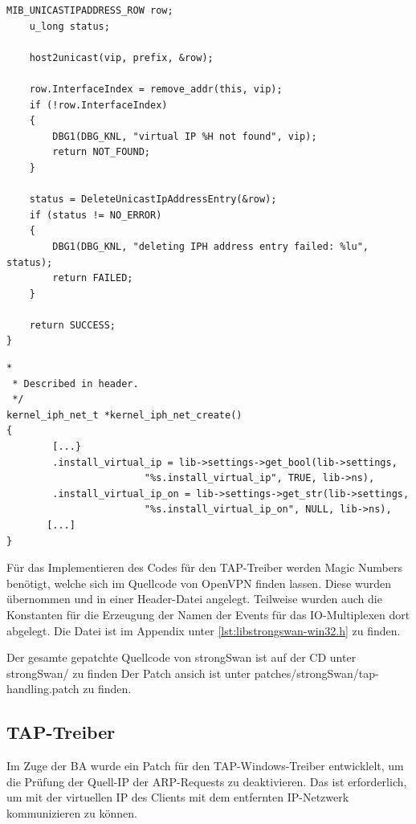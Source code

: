 {\begin{lstlisting}[caption=Code für del\_ip]
	MIB_UNICASTIPADDRESS_ROW row;
	u_long status;

	host2unicast(vip, prefix, &row);

	row.InterfaceIndex = remove_addr(this, vip);
	if (!row.InterfaceIndex)
	{
		DBG1(DBG_KNL, "virtual IP %H not found", vip);
		return NOT_FOUND;
	}

	status = DeleteUnicastIpAddressEntry(&row);
	if (status != NO_ERROR)
	{
		DBG1(DBG_KNL, "deleting IPH address entry failed: %lu", status);
		return FAILED;
	}

	return SUCCESS;
}
\end{lstlisting}

\begin{lstlisting}[caption=Ergänzung zu kernel\_iph\_net\_create()]
*
 * Described in header.
 */
kernel_iph_net_t *kernel_iph_net_create()
{
        [...}
		.install_virtual_ip = lib->settings->get_bool(lib->settings,
						"%s.install_virtual_ip", TRUE, lib->ns),
		.install_virtual_ip_on = lib->settings->get_str(lib->settings,
						"%s.install_virtual_ip_on", NULL, lib->ns),
	   [...]
}
\end{lstlisting}

Für das Implementieren des Codes für den TAP-Treiber werden Magic Numbers benötigt,
welche sich im Quellcode von OpenVPN finden lassen. Diese wurden übernommen
und in einer Header-Datei angelegt.
Teilweise wurden auch die Konstanten für die Erzeugung der Namen der Events für
das IO-Multiplexen dort abgelegt. Die Datei ist im Appendix unter \autoref{lst:libstrongswan-win32.h}
zu finden.

Der gesamte gepatchte Quellcode von strongSwan ist auf der CD unter strongSwan/ zu finden
Der Patch ansich ist unter patches/strongSwan/tap-handling.patch zu finden.

\subsection{TAP-Treiber}
Im Zuge der \ac{BA} wurde ein Patch für den TAP-Windows-Treiber entwicklelt, um die
Prüfung der Quell-IP der ARP-Requests zu deaktivieren. Das ist erforderlich, um mit der
virtuellen IP des Clients mit dem entfernten IP-Netzwerk kommunizieren zu können.


}

